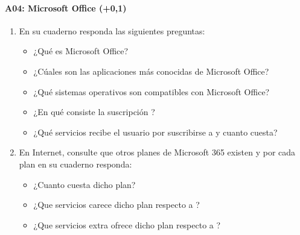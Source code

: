 \documentclass[letterpaper,10pt,spanish]{sphinxmanual}
\begin{document}
\paragraph{A04: Microsoft Office (+0,1)}
\label{\detokenize{cursos/ofimatica10/periodo01/G01:a04-microsoft-office-0-1}}
\sphinxAtStartPar
{}
\begin{enumerate}
%
\item {} 
\sphinxAtStartPar
En su cuaderno responda las siguientes preguntas:
\begin{itemize}
\item {} 
\sphinxAtStartPar
¿Qué es Microsoft Office?

\item {} 
\sphinxAtStartPar
¿Cúales son las aplicaciones más conocidas de Microsoft Office?

\item {} 
\sphinxAtStartPar
¿Qué sistemas operativos son compatibles con Microsoft Office?

\item {} 
\sphinxAtStartPar
¿En qué consiste la suscripción ?

\item {} 
\sphinxAtStartPar
¿Qué servicios recibe el usuario por suscribirse a  y cuanto cuesta?

\end{itemize}

\item {} 
\sphinxAtStartPar
En Internet, consulte que otros planes de Microsoft 365 existen y por cada plan en su cuaderno responda:
\begin{itemize}
\item {} 
\sphinxAtStartPar
¿Cuanto cuesta dicho plan?

\item {} 
\sphinxAtStartPar
¿Que servicios carece dicho plan respecto a ?

\item {} 
\sphinxAtStartPar
¿Que servicios extra ofrece dicho plan respecto a ?

\end{itemize}

\end{enumerate}
\end{document}

